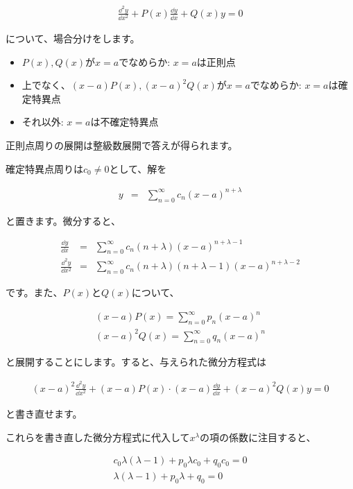 \begin{eqnarray}
    \frac{\dd^2 y}{\dd x^2}+P(x)\frac{\dd y}{\dd x}+Q(x)y=0
\end{eqnarray}

\noindent
について、場合分けをします。

\begin{itemize}
    \item $P(x),Q(x)$が$x=a$でなめらか: $x=a$は正則点
    \item 上でなく、$(x-a)P(x),(x-a)^2Q(x)$が$x=a$でなめらか: $x=a$は確定特異点
    \item それ以外: $x=a$は不確定特異点
\end{itemize}

正則点周りの展開は整級数展開で答えが得られます。

確定特異点周りは$c_0\neq0$として、解を

\begin{eqnarray}
    y&=&\sum_{n=0}^\infty c_n(x-a)^{n+\lambda}
\end{eqnarray}

\noindent
と置きます。微分すると、

\begin{eqnarray}
    \frac{\dd y}{\dd x}&=&\sum_{n=0}^\infty c_n(n+\lambda)(x-a)^{n+\lambda-1} \\
    \frac{\dd^2 y}{\dd x^2}&=&\sum_{n=0}^\infty c_n(n+\lambda)(n+\lambda-1)(x-a)^{n+\lambda-2}
\end{eqnarray}

\noindent
です。また、$P(x)$と$Q(x)$について、

\begin{eqnarray}
    (x-a)P(x)=\sum_{n=0}^\infty p_n(x-a)^n \\
    (x-a)^2Q(x)=\sum_{n=0}^\infty q_n(x-a)^n
\end{eqnarray}

\noindent
と展開することにします。すると、与えられた微分方程式は

\begin{eqnarray}
    (x-a)^2\frac{\dd^2 y}{\dd x^2}+(x-a)P(x)\cdot(x-a)\frac{\dd y}{\dd x}+(x-a)^2Q(x)y=0
\end{eqnarray}

\noindent
と書き直せます。

これらを書き直した微分方程式に代入して$x^\lambda$の項の係数に注目すると、

\begin{eqnarray}
    c_0\lambda(\lambda-1)+p_0\lambda c_0+q_0c_0=0 \\
    \lambda(\lambda-1)+p_0\lambda+q_0=0
\end{eqnarray}


